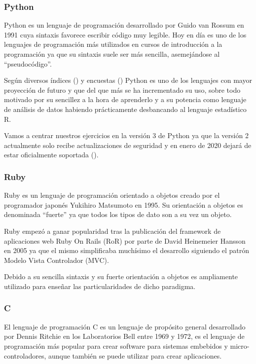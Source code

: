 \subsubsection{Python}

Python es un lenguaje de programación desarrollado por Guido van Rossum en 1991 cuya sintaxis favorece escribir código muy legible. Hoy en día es uno de los lenguajes de programación más utilizados en cursos de introducción a la programación ya que su sintaxis suele ser más sencilla, asemejándose al ``pseudocódigo''.

Según diversos índices (\cite{TIOBE2019}) y encuestas (\cite{stack_overflow_stack_2019}) Python es uno de los lenguajes con mayor proyección de futuro y que del que más se ha incrementado su uso, sobre todo motivado por su sencillez a la hora de aprenderlo y a su potencia como lenguaje de análisis de datos habiendo prácticamente desbancando al lenguaje estadístico R.

\bigskip
Vamos a centrar nuestros ejercicios en la versión 3 de Python ya que la versión 2 actualmente solo recibe actualizaciones de seguridad y en enero de 2020 dejará de estar oficialmente soportada (\cite{python.org_pep_2018}).

\subsubsection{Ruby}

Ruby es un lenguaje de programación orientado a objetos creado por el programador japonés Yukihiro Matsumoto en 1995. Su orientación a objetos es denominada ``fuerte'' ya que todos los tipos de dato son a su vez un objeto.

\bigskip
Ruby empezó a ganar popularidad tras la publicación del framework de aplicaciones web Ruby On Rails (RoR) por parte de David Heinemeier Hansson en 2005 ya que el mismo simplificaba muchísimo el desarrollo siguiendo el patrón Modelo Vista Controlador (MVC).

\bigskip
Debido a su sencilla sintaxis y su fuerte orientación a objetos es ampliamente utilizado para enseñar las particularidades de dicho paradigma.

\subsubsection{C}

El lenguaje de programación C es un lenguaje de propósito general desarrollado por Dennis Ritchie en los Laboratorios Bell entre 1969 y 1972, es el lenguaje de programación más popular para crear software para sistemas embebidos y micro-controladores, aunque también se puede utilizar para crear aplicaciones.

